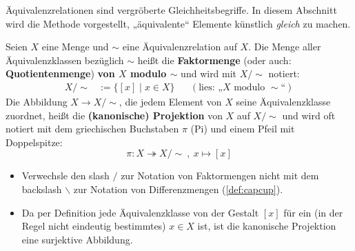 Äquivalenzrelationen sind vergröberte Gleichheitsbegriffe. In diesem Abschnitt wird die Methode vorgestellt, „äquivalente“ Elemente künstlich \emph{gleich} zu machen.


\begin{defin} \label{def:faktormenge}   
    Seien $X$ eine Menge und $\sim$ eine Äquivalenzrelation auf $X$. Die Menge aller Äquivalenzklassen bezüglich $\sim$ heißt die \textbf{Faktormenge} (oder auch: \textbf{Quotientenmenge}) \textbf{von $X$ modulo $\sim$} und wird mit $X/{\sim}$ notiert:
    \begin{align*}
        X/{\sim} & := \big\{ [x] \mid x\in X \big\} && (\text{lies: „$X$ modulo ${\sim}$“})
    \end{align*}
    Die Abbildung $X\to X/{\sim}$, die jedem Element von $X$ seine Äquivalenzklasse zuordnet, heißt die \textbf{(kanonische) Projektion} von $X$ auf $X/{\sim}$ und wird oft notiert mit dem griechischen Buchstaben $\pi$ (Pi) und einem Pfeil mit Doppelspitze:
        \[ \pi : X \twoheadrightarrow X/{\sim}\ ,\ x \mapsto [x] \]
\end{defin}


\begin{bem} \quad
    \begin{itemize}
        \item Verwechsle den slash $\slash$ zur Notation von Faktormengen nicht mit dem backslash $\backslash$ zur Notation von Differenzmengen (\cref{def:capcup}).
        \item Da per Definition jede Äquivalenzklasse von der Gestalt $[x]$ für ein (in der Regel nicht eindeutig bestimmtes) $x\in X$ ist, ist die kanonische Projektion eine surjektive Abbildung.
    \end{itemize}
\end{bem}


